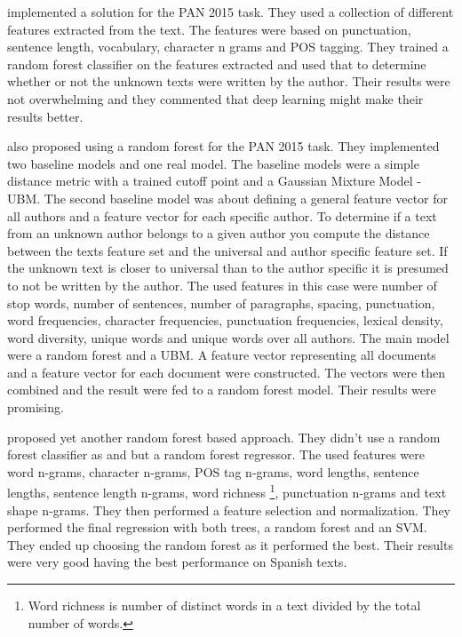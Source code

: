 \cite{maitra2015} implemented a solution for the PAN 2015 task. They used a
collection of different features extracted from the text. The features were
based on punctuation, sentence length, vocabulary, character n grams and
\gls{POS} tagging. They trained a random forest classifier on the features
extracted and used that to determine whether or not the unknown texts were
written by the author. Their results were not overwhelming and they commented
that deep learning might make their results better.

\cite{pacheco2015} also proposed using a random forest for the PAN 2015 task.
They implemented two baseline models and one real model. The baseline models
were a simple distance metric with a trained cutoff point and a Gaussian Mixture
Model - \gls{UBM}. The second baseline model was about defining a general
feature vector for all authors and a feature vector for each specific author. To
determine if a text from an unknown author belongs to a given author you compute
the distance between the texts feature set and the universal and author specific
feature set. If the unknown text is closer to universal than to the author
specific it is presumed to not be written by the author. The used features in
this case were number of stop words, number of sentences, number of paragraphs,
spacing, punctuation, word frequencies, character frequencies, punctuation
frequencies, lexical density, word diversity, unique words and unique words
over all authors. The main model were a random forest and a \gls{UBM}. A feature
vector representing all documents and a feature vector for each document were
constructed. The vectors were then combined and the result were fed to a random
forest model. Their results were promising.

\cite{bartoli2015b} proposed yet another random forest based approach.
They didn't use a random forest classifier as \cite{maitra2015} and
\cite{pacheco2015} but a random forest regressor. The used features were word
n-grams, character n-grams, \gls{POS} tag n-grams, word lengths, sentence
lengths, sentence length n-grams, word richness \footnote{Word richness is
number of distinct words in a text divided by the total number of words.},
punctuation n-grams and text shape n-grams. They then performed a feature
selection and normalization. They performed the final regression with both
trees, a random forest and an SVM. They ended up choosing the random forest as
it performed the best. Their results were very good having the best performance
on Spanish texts.

